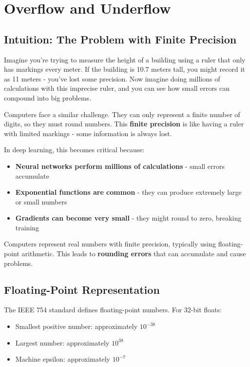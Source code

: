 
\section{Overflow and Underflow}
\label{sec:overflow-underflow}

\subsection{Intuition: The Problem with Finite Precision}

Imagine you're trying to measure the height of a building using a ruler that only has markings every meter. If the building is 10.7 meters tall, you might record it as 11 meters - you've lost some precision. Now imagine doing millions of calculations with this imprecise ruler, and you can see how small errors can compound into big problems.

Computers face a similar challenge. They can only represent a finite number of digits, so they must round numbers. This \textbf{finite precision} is like having a ruler with limited markings - some information is always lost.

In deep learning, this becomes critical because:
\begin{itemize}
    \item \textbf{Neural networks perform millions of calculations} - small errors accumulate
    \item \textbf{Exponential functions are common} - they can produce extremely large or small numbers
    \item \textbf{Gradients can become very small} - they might round to zero, breaking training
\end{itemize}

Computers represent real numbers with finite precision, typically using floating-point arithmetic. This leads to \textbf{rounding errors} that can accumulate and cause problems.

\subsection{Floating-Point Representation}

The IEEE 754 standard defines floating-point numbers. For 32-bit floats:
\begin{itemize}
    \item Smallest positive number: approximately $10^{-38}$
    \item Largest number: approximately $10^{38}$
    \item Machine epsilon: approximately $10^{-7}$
\end{itemize}

